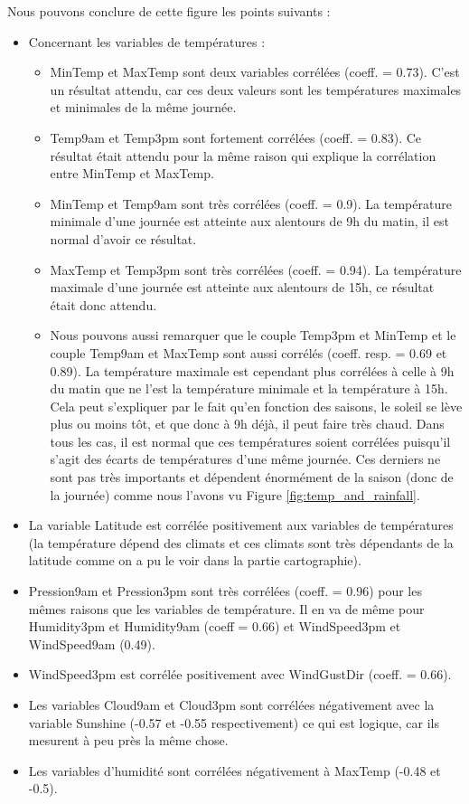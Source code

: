 \documentclass{article}
\begin{document}
Nous pouvons conclure de cette figure les points suivants : 
\begin{itemize}
    \item Concernant les variables de températures : 
    \begin{itemize}
        \item MinTemp et MaxTemp sont deux variables corrélées (coeff. = 0.73). C'est un résultat attendu, car ces deux valeurs sont les températures maximales et minimales de la même journée. 
        \item Temp9am et Temp3pm sont fortement corrélées (coeff. = 0.83). Ce résultat était attendu pour la même raison qui explique la corrélation entre MinTemp et MaxTemp.
        \item MinTemp et Temp9am sont très corrélées (coeff. = 0.9). La température minimale d'une journée est atteinte aux alentours de 9h du matin, il est normal d'avoir ce résultat. 
        \item MaxTemp et Temp3pm sont très corrélées (coeff. = 0.94). La température maximale d'une journée est atteinte aux alentours de 15h, ce résultat était donc attendu. 
        \item Nous pouvons aussi remarquer que le couple Temp3pm et MinTemp et le couple Temp9am et MaxTemp sont aussi corrélés (coeff. resp. = 0.69 et 0.89). La température maximale est cependant plus corrélées à celle à 9h du matin que ne l'est la température minimale et la température à 15h. Cela peut s'expliquer par le fait qu'en fonction des saisons, le soleil se lève plus ou moins tôt, et que donc à 9h déjà, il peut faire très chaud. Dans tous les cas, il est normal que ces températures soient corrélées puisqu'il s'agit des écarts de températures d'une même journée. Ces derniers ne sont pas très importants et dépendent énormément de la saison (donc de la journée) comme nous l'avons vu Figure \ref{fig:temp_and_rainfall}. 
    \end{itemize}
    \item La variable Latitude est corrélée positivement aux variables de températures (la température dépend des climats et ces climats sont très dépendants de la latitude comme on a pu le voir dans la partie cartographie).
    \item Pression9am et Pression3pm sont très corrélées (coeff. = 0.96) pour les mêmes raisons que les variables de température. Il en va de même pour Humidity3pm et Humidity9am (coeff = 0.66) et WindSpeed3pm et WindSpeed9am (0.49).
    \item WindSpeed3pm est corrélée positivement avec WindGustDir (coeff. = 0.66).
    \item Les variables Cloud9am et Cloud3pm sont corrélées négativement avec la variable Sunshine (-0.57 et -0.55 respectivement) ce qui est logique, car ils mesurent à peu près la même chose. 
    \item Les variables d'humidité sont corrélées négativement à MaxTemp (-0.48 et -0.5).
\end{itemize}
\end{document}

